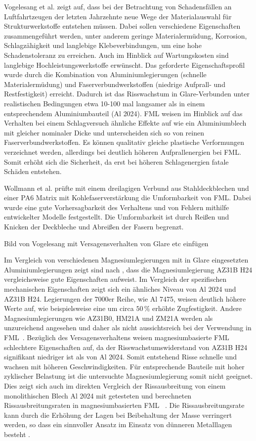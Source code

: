 Vogelesang et al. \cite{Vogelesang.2000} zeigt auf, dass bei der Betrachtung von Schadensfällen an Luftfahrtzeugen der letzten Jahrzehnte neue Wege der Materialauswahl für Strukturwerkstoffe entstehen müssen.
Dabei sollen verschiedene Eigenschaften zusammengeführt werden, unter anderem geringe Materialermüdung, Korrosion, Schlagzähigkeit und langlebige Klebeverbindungen, um eine hohe Schadenstoleranz zu erreichen.
Auch im Hinblick auf Wartungskosten sind langlebige Hochleistungswerkstoffe erwünscht.
Das geforderte Eigenschaftsprofil wurde durch die Kombination von Aluminiumlegierungen (schnelle Materialermüdung) und Faserverbundwerkstoffen (niedrige Aufprall- und Restfestigkeit) erreicht.
Dadurch ist das Risswachstum in Glare-Verbunden unter realistischen Bedingungen etwa 10-100 mal langsamer als in einem entsprechendem Aluminiumbauteil (Al 2024).
FML weisen im Hinblick auf das Verhalten bei einem Schlagversuch ähnliche Effekte auf wie ein Aluminiumblech mit gleicher nominaler Dicke und unterscheiden sich so von reinen Faserverbundwerkstoffen.
Es können qualitativ gleiche plastische Verformungen verzeichnet werden, allerdings bei deutlich höheren Aufprallenergien bei FML.
Somit erhöht sich die Sicherheit, da erst bei höheren Schlagenergien fatale Schäden entstehen.

Wollmann et al. \cite{Wollmann.2018} prüfte mit einem dreilagigen Verbund aus Stahldeckblechen und einer PA6 Matrix mit Kohlefaserverstärkung die Umformbarkeit von FML.
Dabei wurde eine gute Vorhersagbarkeit des Verhaltens und von Fehlern mithilfe entwickelter Modelle festgestellt.
Die Umformbarkeit ist durch Reißen und Knicken der Deckbleche und Abreißen der Fasern begrenzt.

Bild von Vogelesang mit Versagensverhalten von Glare etc einfügen

Im Vergleich von verschiedenen Magnesiumlegierungen mit in Glare eingesetzten Aluminiumlegierungen zeigt sind nach \cite{Alderliesten.2008}, dass die Magnesiumlegierung AZ31B H24  vergleichsweise gute Eigenschaften aufweist. 
Im Vergleich der spezifischen mechanischen Eigenschaften zeigt sich ein ähnliches Niveau von Al 2024 und AZ31B H24.
Legierungen der 7000er Reihe, wie Al 7475, weisen deutlich höhere Werte auf, wie beispielsweise eine um circa $50 \, \%$ erhöhte Zugfestigkeit.
Andere Magnesiumlegierungen wie AZ31B0, HM21A und ZM21A werden als unzureichend angesehen und daher als nicht aussichtsreich bei der Verwendung in FML~.
Bezüglich des Versagensverhaltens weisen magnesiumbasierte FML schlechtere Eigenschaften auf, da der Risswachstumswiderstand von AZ31B H24 signifikant niedriger ist als von Al 2024.
Somit entstehend Risse schnelle und wachsen mit höheren Geschwindigkeiten.
Für entsprechende Bauteile mit hoher zyklischer Belastung ist die untersuchte Magnesiumlegierung somit nicht geeignet.
Dies zeigt sich auch im direkten Vergleich der Rissausbreitung von einem monolithischen Blech Al 2024 mit getesteten und berechneten Rissausbreitungsraten in magnesiumbasierten FML \cite{Alderliesten.2018,Cortes.2005}~.
Die Rissausbreitungsrate kann durch die Erhöhung der Lagen bei Beibehaltung der Masse verringert werden, so dass ein sinnvoller Ansatz im Einsatz von dünneren Metalllagen besteht \cite{Alderliesten.2008}.

